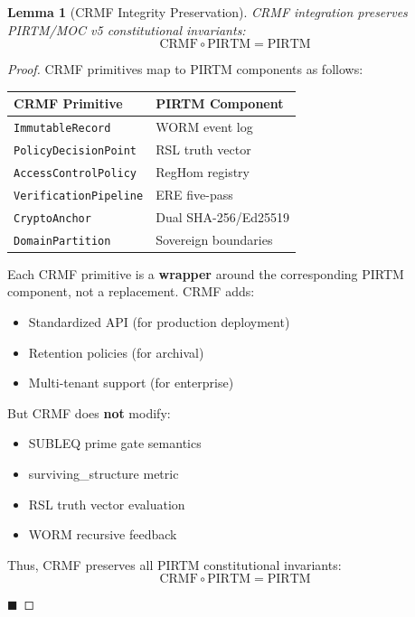 \documentclass[11pt,a4paper]{article}
\newtheorem{lemma}[theorem]{Lemma}
\begin{document}
\begin{lemma}[CRMF Integrity Preservation]\label{lemma:crmf_integrity}
CRMF integration preserves PIRTM/MOC v5 constitutional invariants:
$$\text{CRMF} \circ \text{PIRTM} = \text{PIRTM}$$
\end{lemma}

\begin{proof}
CRMF primitives map to PIRTM components as follows:
\begin{table}[h]
\centering
\begin{tabular}{@{}l l@{}}
\toprule
\textbf{CRMF Primitive} & \textbf{PIRTM Component} \\
\midrule
\texttt{ImmutableRecord} & WORM event log \\
\texttt{PolicyDecisionPoint} & RSL truth vector \\
\texttt{AccessControlPolicy} & RegHom registry \\
\texttt{VerificationPipeline} & ERE five-pass \\
\texttt{CryptoAnchor} & Dual SHA-256/Ed25519 \\
\texttt{DomainPartition} & Sovereign boundaries \\
\bottomrule
\end{tabular}
\end{table}

Each CRMF primitive is a \textbf{wrapper} around the corresponding PIRTM component, not a replacement. CRMF adds:
\begin{itemize}
    \item Standardized API (for production deployment)
    \item Retention policies (for archival)
    \item Multi-tenant support (for enterprise)
\end{itemize}

But CRMF does \textbf{not} modify:
\begin{itemize}
    \item SUBLEQ prime gate semantics
    \item surviving\_structure metric
    \item RSL truth vector evaluation
    \item WORM recursive feedback
\end{itemize}

Thus, CRMF preserves all PIRTM constitutional invariants:
$$\text{CRMF} \circ \text{PIRTM} = \text{PIRTM}$$

\hfill $\blacksquare$
\end{proof}
\end{document}
